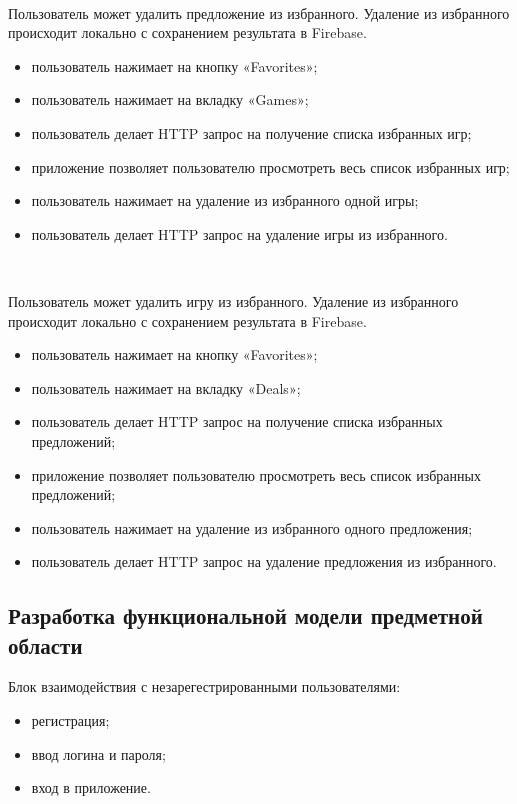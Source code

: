 ~\par
Пользователь может удалить предложение из избранного. Удаление из избранного происходит локально с сохранением результата в Firebase.

\begin{itemize}
  \item пользователь нажимает на кнопку «Favorites»;
  \item пользователь нажимает на вкладку «Games»;
  \item пользователь делает HTTP запрос на получение списка избранных игр;
  \item приложение позволяет пользователю просмотреть весь список избранных игр;
  \item пользователь нажимает на удаление из избранного одной игры;
  \item пользователь делает HTTP запрос на удаление игры из избранного.
\end{itemize}



~\par
Пользователь может удалить игру из избранного. Удаление из избранного происходит локально с сохранением результата в Firebase.

\begin{itemize}
  \item пользователь нажимает на кнопку «Favorites»;
  \item пользователь нажимает на вкладку «Deals»;
  \item пользователь делает HTTP запрос на получение списка избранных предложений;
  \item приложение позволяет пользователю просмотреть весь список избранных предложений;
  \item пользователь нажимает на удаление из избранного одного предложения;
  \item пользователь делает HTTP запрос на удаление предложения из избранного.
\end{itemize}

\subsection{Разработка функциональной модели предметной области}

Блок взаимодействия с незарегестрированными пользователями:

\begin{itemize}
    \item регистрация;
    \item ввод логина и пароля;
    \item вход в приложение.
\end{itemize}

